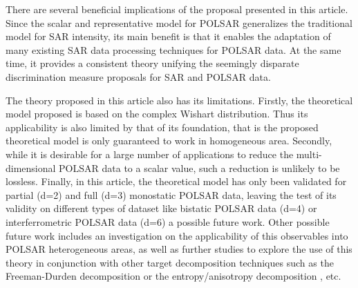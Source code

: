 \documentclass[journal]{IEEEtran}
\begin{document}
There are several beneficial implications of the proposal presented in this article.
Since the scalar and representative model for POLSAR generalizes the traditional model for SAR intensity,
  its main benefit is that it enables the adaptation of many existing SAR data processing techniques for POLSAR data.
At the same time, it provides a consistent theory unifying the seemingly disparate discrimination measure proposals for SAR and POLSAR data.  

The theory proposed in this article also has its limitations.
Firstly, the theoretical model proposed is based on the complex Wishart distribution.
Thus its applicability is also limited by that of its foundation,
  that is the proposed theoretical model is only guaranteed to work in homogeneous area.
Secondly, while it is desirable for a large number of applications to reduce the multi-dimensional POLSAR data to a scalar value,
  such a reduction is unlikely to be lossless.
Finally, in this article, the theoretical model has only been validated for partial (d=2) and full (d=3) monostatic POLSAR data,
  leaving the test of its validity on different types of dataset like bistatic POLSAR data (d=4) or interferrometric POLSAR data (d=6) a possible future work.
Other possible future work includes
  an investigation on the applicability of this observables into POLSAR heterogeneous areas,
  as well as further studies to explore the use of this theory in conjunction with other target decomposition techniques
    such as the Freeman-Durden decomposition \cite{Freeman_1998_TGRS_963} or the entropy/anisotropy decomposition \cite{Cloude_1997_TGRS_68}, etc.
\end{document}
